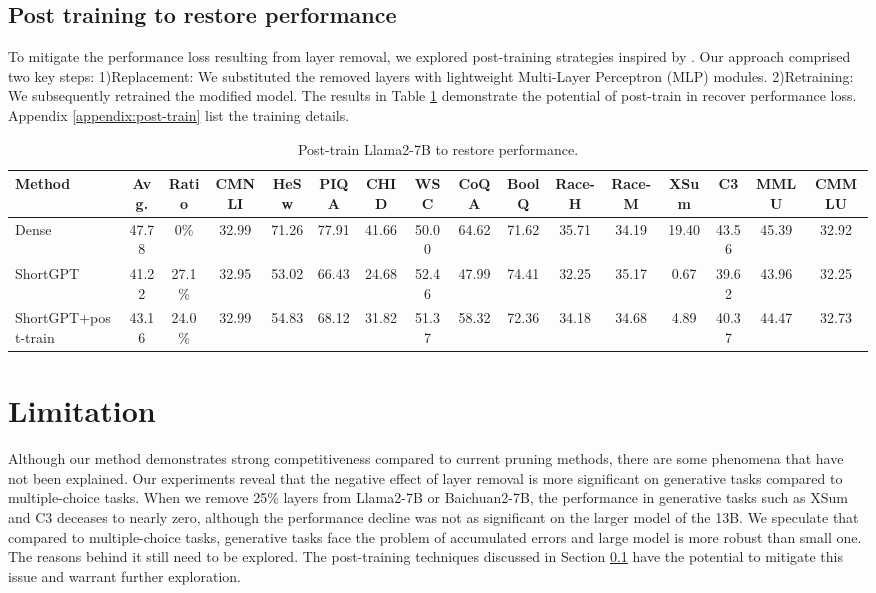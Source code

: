 		
		\subsection{Post training to restore performance} \label{sec:post training}
		To mitigate the performance loss resulting from layer removal, we explored post-training strategies inspired by \cite{chen2024compressing}. Our approach comprised two key steps: 1)Replacement: We substituted the removed layers with lightweight Multi-Layer Perceptron (MLP) modules. 2)Retraining: We subsequently retrained the modified model. The results in Table \ref{tab:replace} demonstrate the potential of post-train in recover performance loss. Appendix \ref{appendix:post-train} list the training details.
		\begin{table}[htbp]
			\setlength{\tabcolsep}{2.8pt}
			\caption{Post-train Llama2-7B to restore performance.}
			\label{tab:replace}
			\centering
			\tiny
			\begin{tabular}{@{}lccccccccccccccc@{}}
				\toprule
				Method & Avg. & Ratio & CMNLI & HeSw & PIQA & CHID & WSC & CoQA & BoolQ & Race-H & Race-M & XSum & C3 & MMLU & CMMLU \\
				\midrule
				Dense & 47.78 & 0\% & 32.99 & 71.26 &77.91& 41.66 & 50.00 & 64.62 & 71.62 & 35.71 & 34.19 & 19.40 & 43.56 & 45.39&32.92 \\
				ShortGPT & 41.22 & 27.1\% & 32.95 & 53.02 & 66.43 & 24.68 & 52.46 & 47.99 & 	74.41	&32.25	&35.17	&0.67	&39.62	&43.96&	32.25 \\
				ShortGPT+post-train &43.16	&24.0\% & 32.99 &	54.83&	68.12&	31.82&51.37&	58.32	&72.36	&34.18	&34.68&	4.89	&40.37	&44.47	&32.73 \\
				\bottomrule
			\end{tabular}
		\end{table}
		
		
		\section{Limitation}\label{limitation}
		Although our method demonstrates strong competitiveness compared to current pruning methods, there are some phenomena that have not been explained. Our experiments reveal that the negative effect of layer removal is more significant on generative tasks compared to multiple-choice tasks. When we remove 25\% layers from Llama2-7B or Baichuan2-7B, the performance in generative tasks such as XSum and C3 deceases to nearly zero, although the performance decline was not as significant on the larger model of the 13B. We speculate that compared to multiple-choice tasks, generative tasks face the problem of accumulated errors and large model is more robust than small one. The reasons behind it still need to be explored. The post-training techniques discussed in Section \ref{sec:post training} have the potential to mitigate this issue and warrant further exploration.
		
